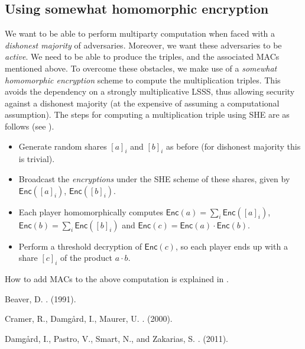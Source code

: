 \documentclass[11pt]{article}
\begin{document}
\subsection*{Using somewhat homomorphic encryption}

We want to be able to perform multiparty computation when faced with a
\textit{dishonest majority} of adversaries. Moreover, we want these adversaries
to be \textit{active}.
We need to be able to produce the triples, and the associated MACs
mentioned above.
To overcome these obstacles, we make use of a \textit{somewhat homomorphic encryption}
scheme to compute the multiplication triples.
This avoids the dependency on
a strongly multiplicative LSSS, thus allowing security against a 
dishonest majority (at the expensive of assuming a computational assumption).
The steps for computing a multiplication triple using SHE are as follows
(see \cite{Damgard}).

\begin{itemize}
\item Generate random shares $[a]_i$ and $[b]_i$ as before (for dishonest
majority this is trivial).

\item Broadcast the \textit{encryptions} under the SHE scheme of these shares,
given by $\mathsf{Enc}([a]_i)$, $\mathsf{Enc}([b]_i)$.

\item Each player homomorphically computes $\mathsf{Enc}(a) = \sum_i \mathsf{Enc}([a]_i)$,
$\mathsf{Enc}(b) = \sum_i \mathsf{Enc}([b]_i)$ and $\mathsf{Enc}(c) = \mathsf{Enc}(a) \cdot \mathsf{Enc}(b)$.

\item Perform a threshold decryption of $\mathsf{Enc}(c)$,
so each player ends up with a share $[c]_i$ of the product $a\cdot b$.

\end{itemize}
How to add MACs to the above computation is explained in \cite{Damgard}.


\begin{thebibliography}{1}

{\sc Beaver, D.}
.
 (1991).

{\sc Cramer, R.,
\sc Damg\r{a}rd, I.,
\sc Maurer, U.}
.
 (2000).

{\sc Damg\r{a}rd, I., Pastro, V., Smart, N., and Zakarias, S.}
.
 (2011).

\end{thebibliography}
\end{document}
